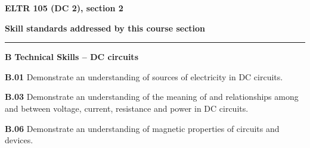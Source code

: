 \vskip 10pt









\vfil \eject

\centerline{\bf ELTR 105 (DC 2), section 2} \bigskip 
 
\vskip 10pt

\noindent
{\bf Skill standards addressed by this course section}

\vskip 5pt

\hrule \vskip 10pt
\noindent
{}

\vskip 5pt

\medskip
\item{\bf B} {\bf Technical Skills -- DC circuits}
\item{\bf B.01} Demonstrate an understanding of sources of electricity in DC circuits.
\item{\bf B.03} Demonstrate an understanding of the meaning of and relationships among and between voltage, current, resistance and power in DC circuits.
\item{\bf B.06} Demonstrate an understanding of magnetic properties of circuits and devices.
\medskip

\vskip 5pt

